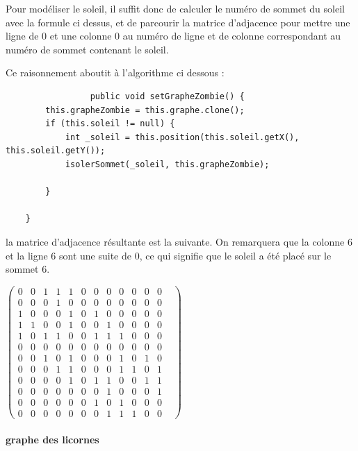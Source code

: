 \documentclass{report}
\begin{document}
				 Pour modéliser le soleil, il suffit donc de calculer le numéro de sommet du soleil avec la formule ci dessus, et de parcourir la matrice d'adjacence pour mettre une ligne de $0$ et une colonne $0$ au numéro de ligne et de colonne correspondant au numéro de sommet contenant le soleil.
				 
				 Ce raisonnement aboutit à l'algorithme ci dessous :\\
				 
				 \begin{verbatim}
				 public void setGrapheZombie() {
        this.grapheZombie = this.graphe.clone();
        if (this.soleil != null) {
            int _soleil = this.position(this.soleil.getX(), this.soleil.getY());
            isolerSommet(_soleil, this.grapheZombie);

        }

    }
				\end{verbatim}
				
				la matrice d'adjacence résultante est la suivante. On remarquera que la colonne 6 et la ligne 6 sont une suite de 0, ce qui signifie que le soleil a été placé sur le sommet 6.\\
				\begin{center}
				\setcounter{MaxMatrixCols}{20}
				$\begin{pmatrix}
			0&0&1&1&1&0&0&0&0&0&0&0&\\
			0&0&0&1&0&0&0&0&0&0&0&0&\\
			1&0&0&0&1&0&1&0&0&0&0&0&\\
			1&1&0&0&1&0&0&1&0&0&0&0&\\
			1&0&1&1&0&0&1&1&1&0&0&0&\\
			0&0&0&0&0&0&0&0&0&0&0&0&\\
			0&0&1&0&1&0&0&0&1&0&1&0&\\
			0&0&0&1&1&0&0&0&1&1&0&1&\\
			0&0&0&0&1&0&1&1&0&0&1&1&\\
			0&0&0&0&0&0&0&1&0&0&0&1&\\
			0&0&0&0&0&0&1&0&1&0&0&0&\\
			0&0&0&0&0&0&0&1&1&1&0&0&
				\end{pmatrix}$	
				\end{center}
											  
				
			
			\paragraph{graphe des licornes}
			
\end{document}
